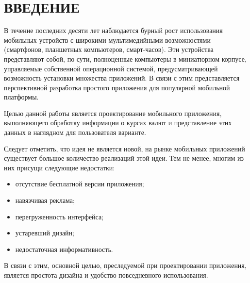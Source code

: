 \section*{ВВЕДЕНИЕ}

В течение последних десяти лет наблюдается бурный рост
использования мобильных устройств с широкими мультимедийными
возможностями (смартфонов, планшетных компьютеров, смарт-часов).
Эти устройства представляют собой, по сути,
полноценные компьютеры в миниатюрном корпусе,
управляемые собственной операционной системой,
предусматривающей возможность установки множества приложений.
В связи с этим представляется перспективной разработка
простого приложения для популярной мобильной платформы.

Целью данной работы является проектирование мобильного приложения,
выполняющего обработку информации о курсах валют и представление этих
данных в наглядном для пользователя варианте.

Следует отметить, что идея не является новой, на рынке мобильных приложений
существует большое количество реализаций этой идеи.
Тем не менее, многим из них присущи следующие недостатки:
\begin{itemize}
\item отсутствие бесплатной версии приложения;
\item навязчивая реклама;
\item перегруженность интерфейса;
\item устаревший дизайн;
\item недостаточная информативность.
\end{itemize}

В связи с этим, основной целью, преследуемой при проектировании приложения,
является простота дизайна и удобство повседневного использования.
